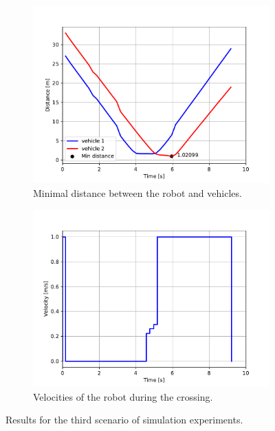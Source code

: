             \begin{figure}[H]
                \centering
                \begin{subfigure}{0.49\linewidth}
                    \centering
                    \includegraphics[trim={24 8 40 41}, clip, width=\linewidth]{images/simulations/scene3_dist.pdf}
                    \caption{Minimal distance between the robot and vehicles.}
                    \label{fig:scene3_graph1}
                \end{subfigure}
                \begin{subfigure}{0.49\linewidth}
                    \centering
                    \includegraphics[trim={21 8 40 41}, clip, width=\linewidth]{images/simulations/scene3_vel.pdf}
                    \caption{Velocities of the robot during the crossing.}
                    \label{fig:scene3_graph2}
                \end{subfigure}
                \caption{Results for the third scenario of simulation experiments.}
                \label{fig:scene3_graphs}
            \end{figure}
